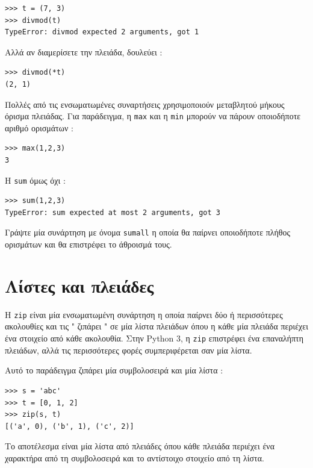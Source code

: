 \documentclass[10pt]{book}
\begin{document}
\begin{verbatim}
>>> t = (7, 3)
>>> divmod(t)
TypeError: divmod expected 2 arguments, got 1
\end{verbatim}
%
 Αλλά αν διαμερίσετε την πλειάδα, δουλεύει :

\begin{verbatim}
>>> divmod(*t)
(2, 1)
\end{verbatim}
%
\begin{exercise}

Πολλές από τις ενσωματωμένες συναρτήσεις χρησιμοποιούν μεταβλητού μήκους όρισμα πλειάδας. Για παράδειγμα, η  {\tt max}  και η  {\tt min}  μπορούν να πάρουν οποιοδήποτε αριθμό ορισμάτων :

\begin{verbatim}
>>> max(1,2,3)
3
\end{verbatim}
%
Η  {\tt sum}  όμως όχι :

\begin{verbatim}
>>> sum(1,2,3)
TypeError: sum expected at most 2 arguments, got 3
\end{verbatim}
%
Γράψτε μία συνάρτηση με όνομα  {\tt sumall}  η οποία θα παίρνει οποιοδήποτε πλήθος ορισμάτων και θα επιστρέφει το άθροισμά τους.
\end{exercise}


\section{Λίστες και πλειάδες}

Η  {\tt zip}  είναι μία ενσωματωμένη συνάρτηση η οποία παίρνει δύο ή περισσότερες ακολουθίες και τις  " ζιπάρει "  σε μία λίστα πλειάδων όπου η κάθε μία πλειάδα περιέχει ένα στοιχείο από κάθε ακολουθία. Στην  Python 3,  η  {\tt zip}  επιστρέφει ένα επαναλήπτη πλειάδων, αλλά τις περισσότερες φορές συμπεριφέρεται σαν μία λίστα.

Αυτό το παράδειγμα ζιπάρει μία συμβολοσειρά και μία λίστα :

\begin{verbatim}
>>> s = 'abc'
>>> t = [0, 1, 2]
>>> zip(s, t)
[('a', 0), ('b', 1), ('c', 2)]
\end{verbatim}
%
 Το αποτέλεσμα είναι μία λίστα από πλειάδες όπου κάθε πλειάδα περιέχει ένα χαρακτήρα από τη συμβολοσειρά και το αντίστοιχο στοιχείο από τη λίστα.
\end{document}
